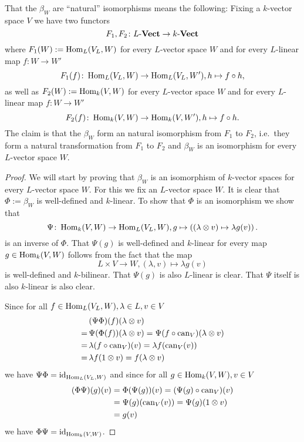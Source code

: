 That the $\beta_W$ are ``natural'' isomorphisms means the following: Fixing a $k$-vector space $V$ we have two functors
\[
 F_1, F_2 \colon L\text{-}\mathbf{Vect} \to k\text{-}\mathbf{Vect}
\]
where $F_1(W) := \operatorname{Hom}_L(V_L,W)$ for every $L$-vector space $W$ and for every $L$-linear map $f \colon W \to W'$
\[
 F_1(f) \colon \operatorname{Hom}_L(V_L, W) \to \operatorname{Hom}_L(V_L, W'), h \mapsto f \circ h,
\]
as well as $F_2(W) := \operatorname{Hom}_k(V,W)$ for every $L$-vector space $W$ and for every $L$-linear map $f \colon W \to W'$
\[
 F_2(f) \colon \operatorname{Hom}_k(V,W) \to \operatorname{Hom}_k(V,W'), h \mapsto f \circ h.
\]
The claim is that the $\beta_W$ form an natural isomorphism from $F_1$ to $F_2$, i.e.\ they form a natural transformation from $F_1$ to $F_2$ and $\beta_W$ is an isomorphism for every $L$-vector space $W$.


\begin{proof}
 We will start by proving that $\beta_W$ is an isomorphism of $k$-vector spaces for every $L$-vector space $W$. For this we fix an $L$-vector space $W$. It is clear that $\Phi := \beta_W$ is well-defined and $k$-linear. To show that $\Phi$ is an isomorphism we show that
 \[
  \Psi \colon \operatorname{Hom}_k(V,W) \to \operatorname{Hom}_L(V_L, W), g \mapsto \left( (\lambda \otimes v) \mapsto \lambda g(v) \right).
 \]
 is an inverse of $\Phi$. That $\Psi(g)$ is well-defined and $k$-linear for every map \mbox{$g \in \operatorname{Hom}_k(V,W)$} follows from the fact that the map
 \[
  L \times V \to W, (\lambda, v) \mapsto \lambda g(v)
 \]
 is well-defined and $k$-bilinear. That $\Psi(g)$ is also $L$-linear is clear. That $\Psi$ itself is also $k$-linear is also clear.
 
 Since for all $f \in \operatorname{Hom}_L(V_L,W), \lambda \in L, v \in V$
 \begin{align*}
   &\,(\Psi \Phi)(f)(\lambda \otimes v) \\
  =&\,\Psi(\Phi(f))(\lambda \otimes v)
  =   \Psi(f \circ \operatorname{can}_V)(\lambda \otimes v) \\
  =&\,\lambda (f \circ \operatorname{can}_V)(v)
  =   \lambda f(\operatorname{can}_V(v)) \\
  =&\,\lambda f(1 \otimes v)
  =   f (\lambda \otimes v)
 \end{align*}
 we have $\Psi \Phi = \operatorname{id}_{\operatorname{Hom}_L(V_L, W)}$ and since for all $g \in \operatorname{Hom}_k(V,W), v \in V$
 \begin{align*}
  (\Phi \Psi)(g)(v)
  &= \Phi(\Psi(g))(v)
  = (\Psi(g) \circ \operatorname{can}_V)(v) \\
  &= \Psi(g)(\operatorname{can}_V(v))
  = \Psi(g)(1 \otimes v) \\
  &= g(v)
 \end{align*}
 we have $\Phi \Psi = \operatorname{id}_{\operatorname{Hom}_k(V,W)}$.
 

\end{proof}
